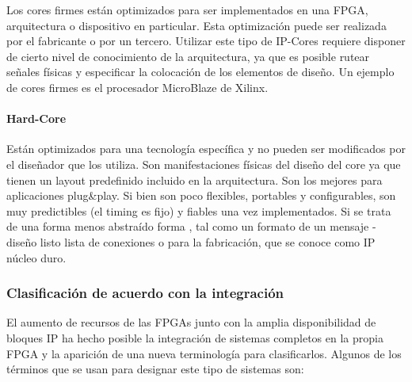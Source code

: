 Los cores firmes están optimizados para ser implementados en una FPGA, arquitectura o dispositivo en particular. Esta optimización puede ser realizada por el fabricante o por un tercero. Utilizar este tipo de IP-Cores requiere disponer de cierto nivel de conocimiento de la arquitectura, ya que es posible rutear señales físicas y especificar la colocación de los elementos de diseño. Un ejemplo de cores firmes es el procesador MicroBlaze de Xilinx.\cite{Etiqueta04}

			\paragraph{Hard-Core}

Están optimizados para una tecnología específica y no pueden ser modificados por el diseñador que los utiliza. Son manifestaciones físicas del diseño del core ya que tienen un layout predefinido incluido en la arquitectura. Son los mejores para aplicaciones plug\&play. Si bien son poco flexibles, portables y configurables, son muy predictibles (el timing es fijo) y fiables una vez implementados.
Si se trata de una forma menos abstraído forma , tal como un formato de un mensaje - diseño listo lista de conexiones o para la fabricación, que se conoce como
IP núcleo duro. \cite{Etiqueta04}

	

	\subsubsection{Clasificación de acuerdo con la integración}

El aumento de recursos de las FPGAs junto con la amplia disponibilidad de bloques IP ha hecho posible la integración de sistemas completos en la propia FPGA y la aparición de una nueva terminología para clasificarlos. Algunos de los términos que se usan para designar este tipo de sistemas son:

